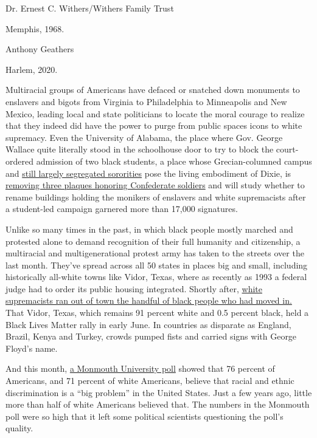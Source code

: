 Dr. Ernest C. Withers/Withers Family Trust

Memphis, 1968.

Anthony Geathers

Harlem, 2020.

Multiracial groups of Americans have defaced or snatched down monuments
to enslavers and bigots from Virginia to Philadelphia to Minneapolis and
New Mexico, leading local and state politicians to locate the moral
courage to realize that they indeed did have the power to purge from
public spaces icons to white supremacy. Even the University of Alabama,
the place where Gov. George Wallace quite literally stood in the
schoolhouse door to try to block the court-ordered admission of two
black students, a place whose Grecian-columned campus and
\href{https://www.al.com/news/birmingham/2018/08/alabama_sororities_desegregate.html}{still
largely segregated sororities} pose the living embodiment of Dixie, is
\href{https://www.montgomeryadvertiser.com/story/news/2020/06/09/university-of-alabama-remove-plaques-honor-confederates-study-renaming-buildings/5325754002/}{removing
three plaques honoring Confederate soldiers} and will study whether to
rename buildings holding the monikers of enslavers and white
supremacists after a student-led campaign garnered more than 17,000
signatures.

Unlike so many times in the past, in which black people mostly marched
and protested alone to demand recognition of their full humanity and
citizenship, a multiracial and multigenerational protest army has taken
to the streets over the last month. They've spread across all 50 states
in places big and small, including historically all-white towns like
Vidor, Texas, where as recently as 1993 a federal judge had to order its
public housing integrated. Shortly after,
\href{https://www.texasmonthly.com/news/black-lives-matter-vidor/}{white
supremacists ran out of town the handful of black people who had moved
in.} That Vidor, Texas, which remains 91 percent white and 0.5 percent
black, held a Black Lives Matter rally in early June. In countries as
disparate as England, Brazil, Kenya and Turkey, crowds pumped fists and
carried signs with George Floyd's name.

And this month,
\href{https://www.monmouth.edu/polling-institute/reports/monmouthpoll_US_060220/}{a
Monmouth University poll} showed that 76 percent of Americans, and 71
percent of white Americans, believe that racial and ethnic
discrimination is a ``big problem'' in the United States. Just a few
years ago, little more than half of white Americans believed that. The
numbers in the Monmouth poll were so high that it left some political
scientists questioning the poll's quality.

